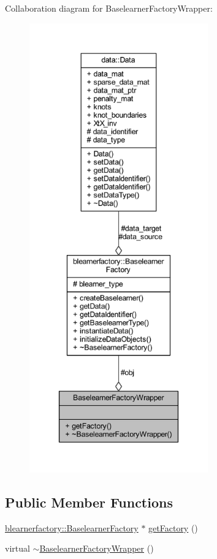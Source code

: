 Collaboration diagram for Baselearner\+Factory\+Wrapper\+:
\nopagebreak
\begin{figure}[H]
\begin{center}
\leavevmode
\includegraphics[height=550pt]{class_baselearner_factory_wrapper__coll__graph}
\end{center}
\end{figure}
\subsection*{Public Member Functions}
\begin{DoxyCompactItemize}
\item 
\mbox{\hyperlink{classblearnerfactory_1_1_baselearner_factory}{blearnerfactory\+::\+Baselearner\+Factory}} $\ast$ \mbox{\hyperlink{class_baselearner_factory_wrapper_ac32811bfb4833aab5d11c7c303070485}{get\+Factory}} ()
\item 
virtual \mbox{\hyperlink{class_baselearner_factory_wrapper_a3c8ce56cb52b424af5369a7e3945b937}{$\sim$\+Baselearner\+Factory\+Wrapper}} ()
\end{DoxyCompactItemize}
